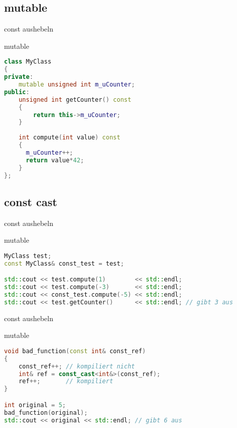 
\subsection{mutable}

\begin{frame}[fragile]{const aushebeln}

\begin{block}{mutable}
\begin{small}
	\begin{lstlisting}[language=C++]
class MyClass
{
private:
    mutable unsigned int m_uCounter;
public:
    unsigned int getCounter() const
    {
        return this->m_uCounter;
    }
    
    int compute(int value) const
    {
      m_uCounter++;
      return value*42;
    }
};
	\end{lstlisting}
	\end{small}
\end{block}

\end{frame}

\subsection{const cast}

\begin{frame}[fragile]{const aushebeln}

\begin{block}{mutable}
\begin{small}
	\begin{lstlisting}[language=C++]
MyClass test;
const MyClass& const_test = test;

std::cout << test.compute(1)        << std::endl;
std::cout << test.compute(-3)       << std::endl;
std::cout << const_test.compute(-5) << std::endl;
std::cout << test.getCounter()      << std::endl; // gibt 3 aus
	\end{lstlisting}
	\end{small}
\end{block}

\end{frame}

\begin{frame}[fragile]{const aushebeln}

\begin{block}{mutable}
\begin{small}
	\begin{lstlisting}[language=C++]
void bad_function(const int& const_ref)
{
    const_ref++; // kompiliert nicht
    int& ref = const_cast<int&>(const_ref);
    ref++;       // kompiliert
}

int original = 5;
bad_function(original);
std::cout << original << std::endl; // gibt 6 aus
	\end{lstlisting}
	\end{small}
\end{block}

\end{frame}